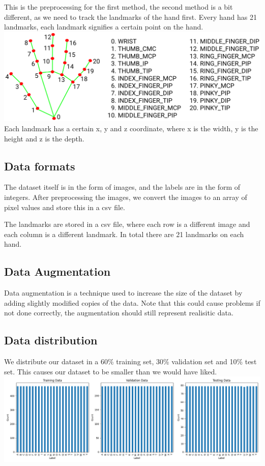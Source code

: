 \documentclass[../paper.tex]{subfiles}
\begin{document}
    This is the preprocessing for the first method, the second method is a bit different, as we need to track the landmarks of the hand first.
    Every hand has 21 landmarks, each landmark signifies a certain point on the hand.
    \includegraphics[width=\linewidth]{hand_landmarks}
    Each landmark has a certain x, y and z coordinate, where x is the width, y is the height and z is the depth.

    \subsection{Data formats}
    The dataset itself is in the form of images, and the labels are in the form of integers. 
    After preprocessing the images, we convert the images to an array of pixel values and store this in a csv file. 

    The landmarks are stored in a csv file, where each row is a different image and each column is a different landmark.
    In total there are 21 landmarks on each hand.

    \subsection{Data Augmentation}
    Data augmentation is a technique used to increase the size of the dataset by adding slightly modified copies of the data.
    Note that this could cause problems if not done correctly, the augmentation should still represent realisitic data.

    \subsection{Data distribution}
    We distribute our dataset in a 60\% training set, 30\% validation set and 10\% test set.
    This causes our dataset to be smaller than we would have liked.
    \includegraphics[width=\linewidth]{dataset_distribution}

    
\end{document}
